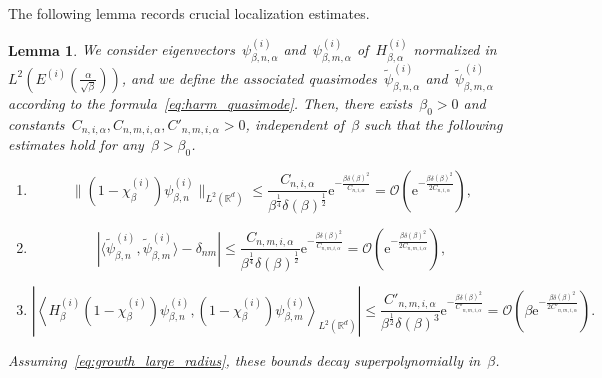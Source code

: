 \documentclass[10pt]{article}
\newcommand{\e}{\mathrm{e}}
\newcommand{\R}{\mathbb{R}}
\newcommand{\1}{\mathbbm 1}
\newcommand{\largeRadius}{\delta}
\newcommand{\halfSpace}[1]{E^{(#1)}}
\renewcommand{\O}{\mathcal{O}}
\newtheorem{lemma}{Lemma}
\begin{document}
    The following lemma records crucial localization estimates.
    \begin{lemma}
        \label{lemma:localization}
        We consider eigenvectors~$\psi_{\beta,n,\alpha}^{(i)}$ and~$\psi_{\beta,m,\alpha}^{(i)}$ of~$H^{(i)}_{\beta,\alpha}$ normalized in~$L^2\left(\halfSpace{i}(\frac{\alpha}{\sqrt\beta})\right)$, and we define the associated quasimodes~$\widetilde\psi_{\beta,n,\alpha}^{(i)}$ and~$\widetilde\psi_{\beta,m,\alpha}^{(i)}$ according to the formula~\eqref{eq:harm_quasimode}.
        Then, there exists~$\beta_0>0$ and constants~$C_{n,i,\alpha},C_{n,m,i,\alpha},{C'}_{n,m,i,\alpha}>0$, independent of~$\beta$ such that the following estimates hold for any~$\beta>\beta_0$.
        \begin{enumerate}[]
            \item{\begin{equation}\label{eq:loc_eqa}\|(1-\chi_\beta^{(i)})\psi_{\beta,n}^{(i)}\|_{L^2(\R^d)} \leq \frac{C_{n,i,\alpha}}{\beta^{\frac14}\largeRadius(\beta)^{\frac12}}\e^{-\frac{\beta\largeRadius(\beta)^2}{C_{n,i,\alpha}}} = \O\left(\e^{-\frac{\beta\largeRadius(\beta)^2}{2C_{n,i,\alpha}}}\right),\end{equation}}
            \item{\begin{equation}\label{eq:loc_eqb}\left|\langle \widetilde\psi_{\beta,n}^{(i)},\widetilde\psi_{\beta,m}^{(i)}\rangle-\delta_{nm}\right| \leq  \frac{C_{n,m,i,\alpha}}{\beta^{\frac14}\largeRadius(\beta)^{\frac12}}\e^{-\frac{\beta\largeRadius(\beta)^2}{C_{n,m,i,\alpha}}}=\O\left(\e^{-\frac{\beta\largeRadius(\beta)^2}{2C_{n,m,i,\alpha}}}\right),\end{equation}}
            \item{\begin{equation}\label{eq:loc_eqc}\left|\left\langle H_\beta^{(i)}(1-\chi_\beta^{(i)})\psi_{\beta,n}^{(i)},(1-\chi_\beta^{(i)})\psi_{\beta,m}^{(i)}\right\rangle_{L^2(\R^d)}\right|\leq \frac{{C'}_{n,m,i,\alpha}}{\beta^{\frac12}\largeRadius(\beta)^{3}}\e^{-\frac{\beta\largeRadius(\beta)^2}{{C'}_{n,m,i,\alpha}}} = \O\left(\beta\e^{-\frac{\beta\largeRadius(\beta)^2}{2{C'}_{n,m,i,\alpha}}}\right).\end{equation}}
        \end{enumerate}
        
        Assuming~\eqref{eq:growth_large_radius}, these bounds decay superpolynomially in~$\beta$.
    \end{lemma}
\end{document}
